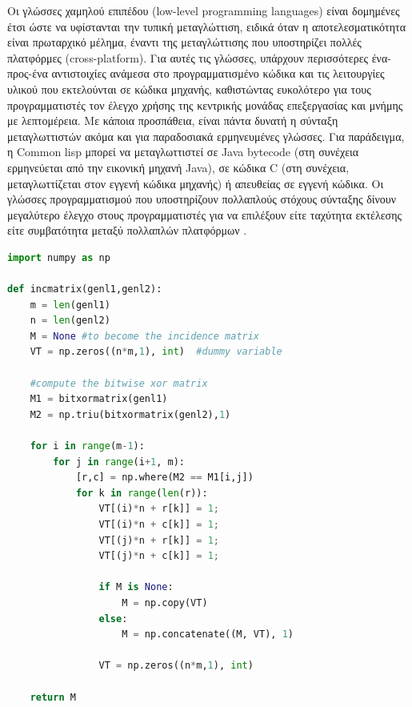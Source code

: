 Οι γλώσσες χαμηλού επιπέδου (low-level programming languages) είναι δομημένες έτσι ώστε να υφίστανται την τυπική μεταγλώττιση, ειδικά όταν η αποτελεσματικότητα είναι πρωταρχικό μέλημα, έναντι της μεταγλώττισης που υποστηρίζει πολλές πλατφόρμες (cross-platform). Για αυτές τις γλώσσες, υπάρχουν περισσότερες ένα-προς-ένα αντιστοιχίες ανάμεσα στο προγραμματισμένο κώδικα και τις λειτουργίες υλικού που εκτελούνται σε κώδικα μηχανής, καθιστώντας ευκολότερο για τους προγραμματιστές τον έλεγχο χρήσης της κεντρικής μονάδας επεξεργασίας και μνήμης με λεπτομέρεια. 
Με κάποια προσπάθεια, είναι πάντα δυνατή η σύνταξη μεταγλωττιστών ακόμα και για παραδοσιακά ερμηνευμένες γλώσσες. Για παράδειγμα, η Common lisp μπορεί να μεταγλωττιστεί σε Java bytecode (στη συνέχεια ερμηνεύεται από την εικονική μηχανή Java), σε κώδικα C (στη συνέχεια, μεταγλωττίζεται στον εγγενή κώδικα μηχανής) ή απευθείας σε εγγενή κώδικα. Οι γλώσσες προγραμματισμού που υποστηρίζουν πολλαπλούς στόχους σύνταξης δίνουν μεγαλύτερο έλεγχο στους προγραμματιστές για να επιλέξουν είτε ταχύτητα εκτέλεσης είτε συμβατότητα μεταξύ πολλαπλών πλατφόρμων \cite{[SQA+07]}.

\clearpage

\begin{lstlisting}[language=Python, caption=\selectlanguage{greek}Παράδειγμα κώδικα σε \selectlanguage{english}Python]
import numpy as np
 
def incmatrix(genl1,genl2):
    m = len(genl1)
    n = len(genl2)
    M = None #to become the incidence matrix
    VT = np.zeros((n*m,1), int)  #dummy variable
 
    #compute the bitwise xor matrix
    M1 = bitxormatrix(genl1)
    M2 = np.triu(bitxormatrix(genl2),1) 
 
    for i in range(m-1):
        for j in range(i+1, m):
            [r,c] = np.where(M2 == M1[i,j])
            for k in range(len(r)):
                VT[(i)*n + r[k]] = 1;
                VT[(i)*n + c[k]] = 1;
                VT[(j)*n + r[k]] = 1;
                VT[(j)*n + c[k]] = 1;
 
                if M is None:
                    M = np.copy(VT)
                else:
                    M = np.concatenate((M, VT), 1)
 
                VT = np.zeros((n*m,1), int)
 
    return M
\end{lstlisting}

